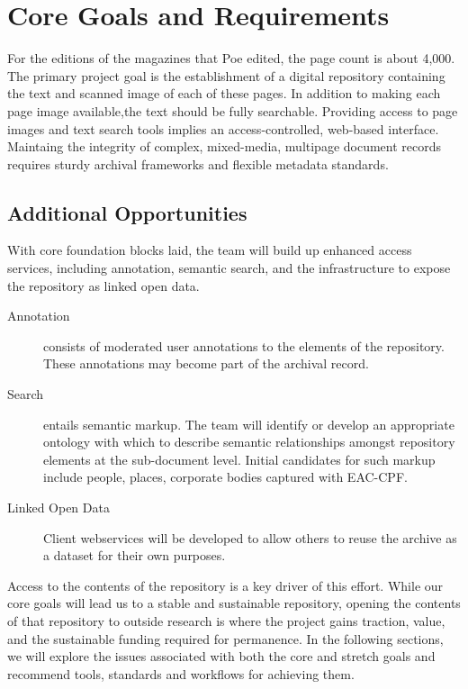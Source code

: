\section{Core Goals and Requirements}
For the editions of the magazines that Poe edited, the page count is about 4,000. The primary project goal is the establishment of a digital repository containing the text and scanned image of each of these pages. In addition to making each page image available,the text should be fully searchable. Providing access to page images and text search tools implies an access-controlled, web-based interface. Maintaing the integrity of complex, mixed-media, multipage document records requires sturdy archival frameworks and flexible metadata standards. 


\subsection{Additional Opportunities}
With core foundation blocks laid, the team will build up enhanced access services, including annotation, semantic search, and the infrastructure to expose the repository as linked open data. 
\begin{description}
  \item[Annotation] consists of moderated user annotations to the elements of the repository. These annotations may become part of the archival record.   
  \item[Search] entails semantic markup. The team will identify or develop an appropriate ontology with which to describe semantic relationships amongst repository elements at the sub-document level. Initial candidates for such markup include people, places, corporate bodies captured with EAC-CPF. 
  \item[Linked Open Data] Client webservices will be developed  to allow others to reuse the archive as a dataset for their own purposes. 
\end{description}
Access to the contents of the repository is a key driver of this effort. While our core goals will lead us to a stable and sustainable repository, opening the contents of that repository to outside research is where the project gains traction, value, and the sustainable funding required for permanence. In the following sections, we will explore the issues associated with both the core and stretch goals and recommend tools, standards and workflows for achieving them.